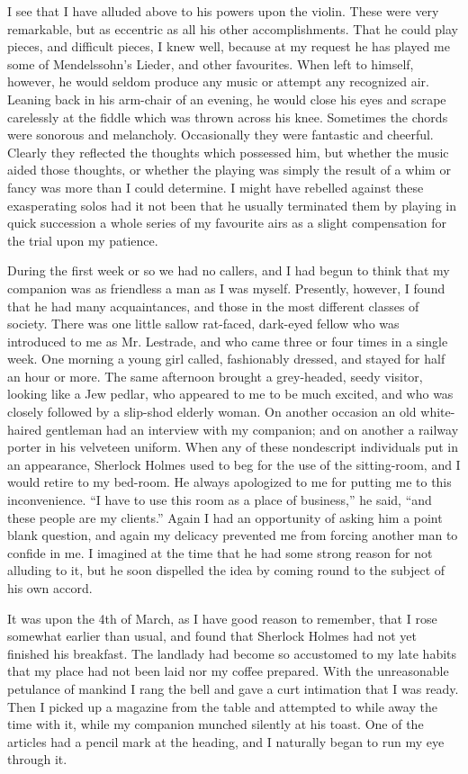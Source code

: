 \documentclass[12pt]{book}
\begin{document}
I see that I have alluded above to his powers upon the violin. These were very remarkable, but as eccentric as all his other accomplishments. That he could play pieces, and difficult pieces, I knew well, because at my request he has played me some of Mendelssohn’s Lieder, and other favourites. When left to himself, however, he would seldom produce any music or attempt any recognized air. Leaning back in his arm-chair of an evening, he would close his eyes and scrape carelessly at the fiddle which was thrown across his knee. Sometimes the chords were sonorous and melancholy. Occasionally they were fantastic and cheerful. Clearly they reflected the thoughts which possessed him, but whether the music aided those thoughts, or whether the playing was simply the result of a whim or fancy was more than I could determine. I might have rebelled against these exasperating solos had it not been that he usually terminated them by playing in quick succession a whole series of my favourite airs as a slight compensation for the trial upon my patience. 

During the first week or so we had no callers, and I had begun to think that my companion was as friendless a man as I was myself. Presently, however, I found that he had many acquaintances, and those in the most different classes of society. There was one little sallow rat-faced, dark-eyed fellow who was introduced to me as Mr. Lestrade, and who came three or four times in a single week. One morning a young girl called, fashionably dressed, and stayed for half an hour or more. The same afternoon brought a grey-headed, seedy visitor, looking like a Jew pedlar, who appeared to me to be much excited, and who was closely followed by a slip-shod elderly woman. On another occasion an old white-haired gentleman had an interview with my companion; and on another a railway porter in his velveteen uniform. When any of these nondescript individuals put in an appearance, Sherlock Holmes used to beg for the use of the sitting-room, and I would retire to my bed-room. He always apologized to me for putting me to this inconvenience. “I have to use this room as a place of business,” he said, “and these people are my clients.” Again I had an opportunity of asking him a point blank question, and again my delicacy prevented me from forcing another man to confide in me. I imagined at the time that he had some strong reason for not alluding to it, but he soon dispelled the idea by coming round to the subject of his own accord. 

It was upon the 4th of March, as I have good reason to remember, that I rose somewhat earlier than usual, and found that Sherlock Holmes had not yet finished his breakfast. The landlady had become so accustomed to my late habits that my place had not been laid nor my coffee prepared. With the unreasonable petulance of mankind I rang the bell and gave a curt intimation that I was ready. Then I picked up a magazine from the table and attempted to while away the time with it, while my companion munched silently at his toast. One of the articles had a pencil mark at the heading, and I naturally began to run my eye through it. 
\end{document}
